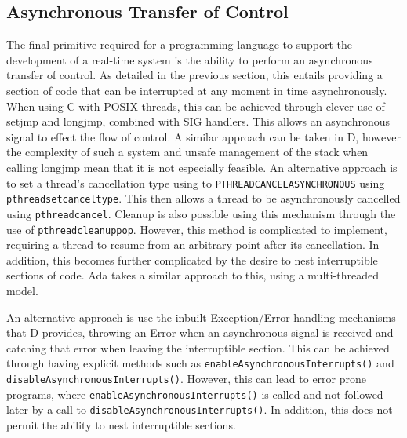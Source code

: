 \subsection{Asynchronous Transfer of Control}
The final primitive required for a programming language to support the development 
of a real-time system is the ability to perform an asynchronous transfer of 
control. As detailed in the previous section, this entails providing a 
section of code that can be interrupted at any moment in time asynchronously. 
When using C with POSIX threads, this can be achieved through clever use of 
setjmp and longjmp, combined with SIG handlers. This allows an asynchronous 
signal to effect the flow of control. A similar approach can be taken in D, 
however the complexity of such a system and unsafe management of the stack when 
calling longjmp 
\cite{unwinding-stack} mean that it is not especially feasible. 
An alternative approach is to set a thread's cancellation type using to 
\texttt{PTHREAD\textunderscore{}CANCEL\textunderscore{}ASYNCHRONOUS} using 
\texttt{pthread\textunderscore{}setcanceltype}. This then allows a thread to 
be asynchronously cancelled using \texttt{pthread\textunderscore{}cancel}. Cleanup 
is also possible using this mechanism through the use of 
\texttt{pthread\textunderscore{}cleanup\textunderscore{}pop}. However, 
this method is complicated to implement, requiring a thread to resume from an 
arbitrary point after its cancellation. In addition, this becomes further 
complicated by the desire to nest interruptible sections of code. 
Ada takes a similar approach to this, using a multi-threaded model. 
\par\bigskip\noindent
An alternative approach is use the inbuilt Exception/Error handling mechanisms 
that D provides, throwing an Error when an asynchronous signal is received and 
catching that error when leaving the interruptible section. This can be 
achieved through having explicit methods such as \texttt{enableAsynchronousInterrupts()}
and \texttt{disableAsynchronousInterrupts()}. However, this can lead to error 
prone programs, where \texttt{enableAsynchronousInterrupts()} is called and not 
followed later by a call to \texttt{disableAsynchronousInterrupts()}. 
In addition, this does not permit the ability to nest interruptible sections. 



